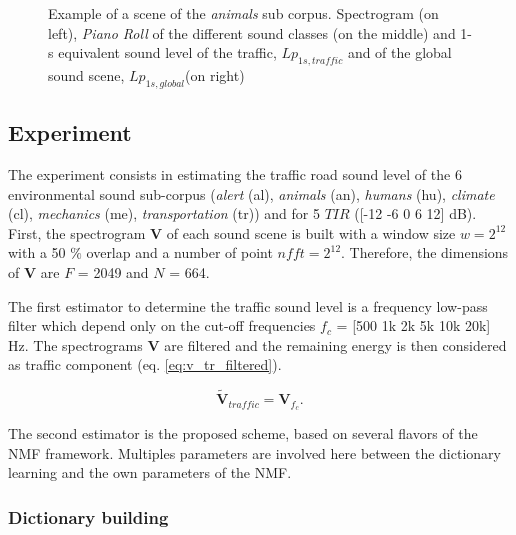 \documentclass[twocolumn,a4paper,10pt]{article}
\begin{document}
\begin{figure}
\begin{minipage}[c]{.32\linewidth}
   \end{minipage}
\caption{Example of a scene of the \textit{animals} sub corpus. Spectrogram (on left), \textit{Piano Roll} of the different sound classes (on the middle) and 1-s equivalent sound level of the traffic, $Lp_{1s,traffic}$ and of the global sound scene, $Lp_{1s,global}$(on right)}
\label{fig:exampleScene}
\end{figure}

\subsection{Experiment}

The experiment consists in estimating the traffic road sound level of the 6 environmental sound sub-corpus (\textit{alert} (al), \textit{animals} (an), \textit{humans} (hu), \textit{climate} (cl), \textit{mechanics} (me), \textit{transportation} (tr)) and for 5 $TIR$ ([-12 -6 0 6 12] dB). First, the spectrogram $\mathbf{V}$ of each sound scene is built with a window size $w = 2^{12}$ with a 50 $\%$ overlap and a number of point $nfft = 2^{12}$. Therefore, the dimensions of $\mathbf{V}$ are $F$ = 2049 and $N$ = 664.

The first estimator to determine the traffic sound level is a frequency low-pass filter which depend only on the cut-off frequencies $f_c$ = [500 1k 2k 5k 10k 20k] Hz. The spectrograms $\mathbf{V}$ are filtered and the remaining energy is then considered as traffic component (eq. \ref{eq:v_tr_filtered}).

\begin{equation}\label{eq:v_tr_filtered}
\mathbf{\tilde{V}}_{traffic} = \mathbf{V}_{f_c}.
\end{equation}

The second estimator is the proposed scheme, based on several flavors of the NMF framework. Multiples parameters are involved here between the dictionary learning and the own parameters of the NMF.

\subsubsection{Dictionary building}\label{part:dictionary_learning}
\end{document}
